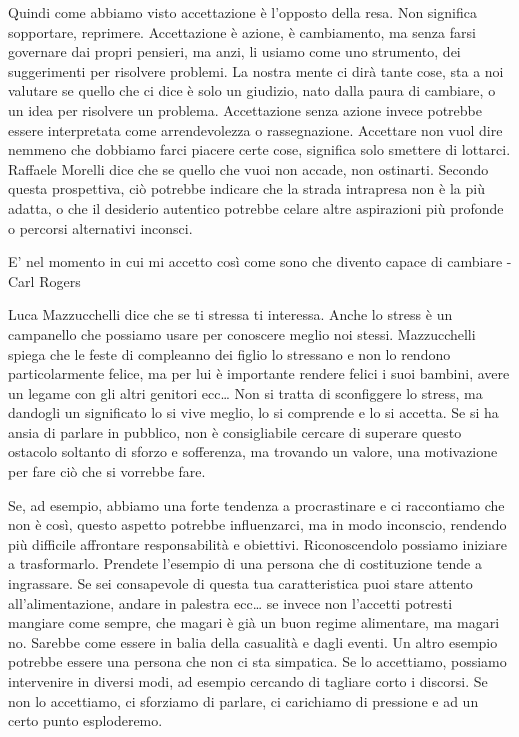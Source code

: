 \documentclass[12pt]{book} %
\begin{document}
Quindi come abbiamo visto accettazione è l'opposto della resa. Non significa sopportare, reprimere.
Accettazione è azione, è cambiamento, ma senza farsi governare dai propri pensieri, ma anzi, li usiamo come uno
strumento, dei suggerimenti per risolvere problemi. La nostra mente ci dirà tante cose, sta a noi valutare se quello
che ci dice è solo un giudizio, nato dalla paura di cambiare, o un idea per risolvere un problema. Accettazione senza
azione invece potrebbe essere interpretata come arrendevolezza o rassegnazione. Accettare non vuol dire nemmeno che dobbiamo farci piacere certe cose,
significa solo smettere di lottarci.
Raffaele Morelli dice che se quello che vuoi non accade, non ostinarti. Secondo questa prospettiva, ciò potrebbe indicare che la strada intrapresa non è la più adatta, o che il desiderio autentico potrebbe celare altre aspirazioni più profonde o percorsi alternativi inconsci. 

E' nel momento in cui mi accetto così come sono che divento capace di cambiare - Carl Rogers

Luca Mazzucchelli dice che se ti stressa ti interessa. Anche lo stress è un campanello che possiamo usare per conoscere
meglio noi stessi. Mazzucchelli spiega che le feste di compleanno dei figlio lo stressano e non lo rendono
particolarmente felice, ma per lui è importante rendere felici i suoi bambini, avere un legame con gli altri genitori
ecc… Non si tratta di sconfiggere lo stress, ma dandogli un significato lo si vive meglio, lo si comprende e lo si
accetta. Se si ha ansia di parlare in pubblico, non è consigliabile cercare di superare questo ostacolo soltanto di sforzo e
sofferenza, ma trovando un valore, una motivazione per fare ciò che si vorrebbe fare.

Se, ad esempio, abbiamo una forte tendenza a procrastinare e ci raccontiamo che non è così, questo aspetto potrebbe influenzarci, ma in modo inconscio, rendendo più difficile affrontare responsabilità e obiettivi. Riconoscendolo possiamo iniziare a trasformarlo. Prendete l'esempio
di una persona che di costituzione tende a ingrassare. Se sei consapevole di questa tua caratteristica puoi stare
attento all'alimentazione, andare in palestra ecc… se invece non l'accetti potresti mangiare come sempre, che magari è già un buon regime alimentare, ma magari no. Sarebbe come essere in
balia della casualità e dagli eventi. Un altro esempio potrebbe essere una persona che non ci sta simpatica.
Se lo accettiamo, possiamo intervenire in diversi modi, ad esempio cercando di tagliare corto i discorsi. Se non lo
accettiamo, ci sforziamo di parlare, ci carichiamo di pressione e ad un certo punto esploderemo.
\end{document}
